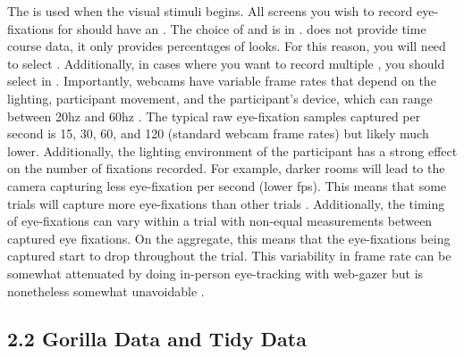 The  is used when the visual stimuli begins. All screens you wish to record eye-fixations for should have an . The choice of  and  is in .  does not provide time course data, it only provides percentages of looks. For this reason, you will need to select . Additionally, in cases where you want to record multiple , you should select   in  . Importantly, webcams have variable frame rates that depend on the lighting, participant movement, and the participant's device, which can range between 20hz and 60hz \parencite{Vos_2017}. The typical raw eye-fixation samples captured per second is 15, 30, 60, and 120 (standard webcam frame rates) but likely much lower. Additionally, the lighting environment of the participant has a strong effect on the number of fixations recorded. For example, darker rooms will lead to the camera capturing less eye-fixation per second (lower fps). This means that some trials will capture more eye-fixations than other trials \parencite{Prystauka_Altmann_Rothman_2023}. Additionally, the timing of eye-fixations can vary within a trial with non-equal measurements between captured eye fixations. On the aggregate, this means that the eye-fixations being captured start to drop throughout the trial. This variability in frame rate can be somewhat attenuated by doing in-person eye-tracking with web-gazer but is nonetheless somewhat unavoidable \parencite[e.g., ][]{Papoutsaki}. 
\newline
\subsection{2.2 Gorilla Data and Tidy Data}

